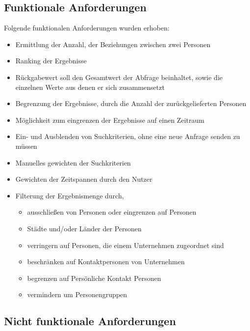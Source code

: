 \subsection{Funktionale Anforderungen}

Folgende funktionalen Anforderungen wurden erhoben:

\begin{itemize}
\item Ermittlung der Anzahl, der Beziehungen zwischen zwei Personen

\item Ranking der Ergebnisse

\item Rückgabewert soll den Gesamtwert der Abfrage beinhaltet, sowie die einzelnen Werte aus denen er sich zusammensetzt

\item Begrenzung der Ergebnisse, durch die Anzahl der zurückgelieferten Personen

\item Möglichkeit zum eingrenzen der Ergebnisse auf einen Zeitraum

\item Ein- und Ausblenden von Suchkriterien, ohne eine neue Anfrage senden zu müssen

\item Manuelles gewichten der Suchkriterien

\item Gewichten der Zeitspannen durch den Nutzer

\item Filterung der Ergebnismenge durch,	
	\begin{itemize}
	\item ausschließen von Personen oder eingrenzen auf Personen
	\item Städte und/oder Länder der Personen
	\item verringern auf Personen, die einem Unternehmen zugeordnet sind 
	\item beschränken auf Kontaktpersonen von Unternehmen
	\item begrenzen auf Persönliche Kontakt Personen
	\item vermindern um Personengruppen
	\end{itemize}
\end{itemize}

\subsection{Nicht funktionale Anforderungen}


